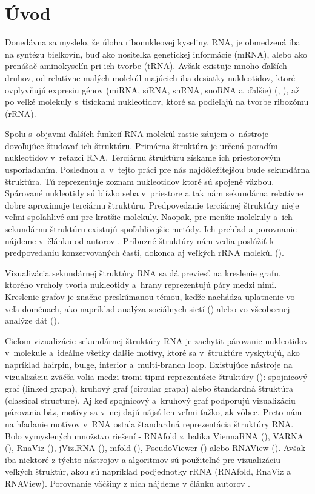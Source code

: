 
\chapter*{Úvod}

Donedávna sa myslelo, že úloha ribonukleovej kyseliny, RNA, je obmedzená
iba na syntézu bielkovín, buď ako nositeľka genetickej informácie (mRNA),
alebo ako prenášač aminokyselín pri ich tvorbe (tRNA).
Avšak existuje mnoho ďalších druhov, od relatívne malých molekúl majúcich
iba desiatky nukleotidov, ktoré ovplyvňujú expresiu génov
(miRNA, siRNA, snRNA, snoRNA a~ďalšie) (\citet{RNA_MI_SI}, \citet{RNA_SN_SNO}),
až po veľké molekuly s~tisíckami nukleotidov, ktoré sa podieľajú na tvorbe ribozómu (rRNA).

Spolu s~objavmi ďalších funkcií RNA molekúl rastie záujem o~nástroje dovoľujúce
študovať ich štruktúru.
Primárna štruktúra je určená poradím nukleotidov v~reťazci RNA.
Terciárnu štruktúru získame ich priestorovým usporiadaním.
Poslednou a~v~tejto práci pre nás najdôležitejšou
bude sekundárna štruktúra. Tú reprezentuje zoznam nukleotidov ktoré sú spojené väzbou.
Spárované nukleotidy sú blízko seba v~priestore a tak nám sekundárna relatívne
dobre aproximuje terciárnu štruktúru. Predpovedanie terciárnej štruktúry nieje veľmi
spoľahlivé ani pre kratšie molekuly. Naopak, pre menšie molekuly a~ich  sekundárnu
štruktúru existujú spoľahlivejšie metódy. Ich prehľad a porovnanie nájdeme v~článku
od autorov \citet{SEC_STR_PREDICT_TOOLS}.
Príbuzné štruktúry nám vedia poslúžiť k predpovedaniu konzervovaných častí, dokonca
aj veľkých rRNA molekúl (\citet{SEC_STR_PREDICTION}).

Vizualizácia sekundárnej štruktúry RNA sa dá previesť na kreslenie grafu,
ktorého vrcholy tvoria nukleotidy a~hrany reprezentujú páry medzi nimi.
Kreslenie grafov je značne preskúmanou témou, keďže nachádza uplatnenie vo veľa
doménach, ako napríklad analýza sociálnych sietí (\citet{SOCIAL_NETWORK_ANALYSIS})
alebo vo všeobecnej analýze dát (\citet{GRAPH_DRAWING}).

Cieľom vizualizácie sekundárnej štruktúry RNA je zachytit párovanie nukleotidov
v~molekule a~ideálne všetky ďalšie motívy, ktoré sa v~štruktúre vyskytujú,
ako napríklad hairpin, bulge, interior a~multi-branch loop.
Existujúce nástroje na vizualizáciu zväčša volia medzi tromi tipmi reprezentácie
štruktúry (\citet{JVIZ}): spojnicový graf (linked graph), kruhový graf (circular graph)
alebo štandardná štruktúra (classical structure).
Aj keď spojnicový a~kruhový graf podporujú vizualizáciu párovania báz, motívy
sa v~nej dajú nájsť len veľmi ťažko, ak vôbec.
Preto nám na hľadanie motívov v~RNA ostala štandardná reprezentácia štruktúry RNA.
Bolo vymyslených množstvo riešení -
RNAfold z~balíka ViennaRNA (\citet{VIENNA_RNA}), VARNA (\citet{VARNA}),
RnaViz (\citet{RNA_VIZ}), jViz.RNA (\citet{JVIZ}), mfold (\citet{MFOLD}),
PseudoViewer (\citet{PSEUDOVIEWER}) alebo RNAView (\citet{RNAVIEW}).
Avšak iba niektoré z týchto nástrojov a algoritmov sú použiteľné pre vizualizáciu
veľkých štruktúr, akou sú napríklad podjednotky rRNA (RNAfold, RnaViz a RNAView).
Porovnanie väčšiny z nich nájdeme v článku autorov \citet{DRAWING_COMPARISION}.

